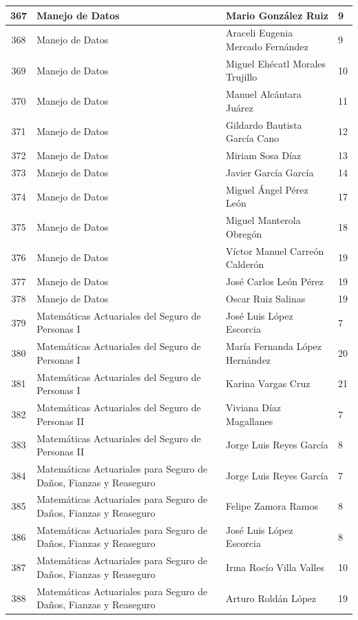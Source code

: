 {\begin{longtable}{|c|p{6.5cm}|p{5cm}|p{1.5cm}|}
  367 & Manejo de Datos & Mario González Ruiz & 9 \\ \hline 
  368 & Manejo de Datos & Araceli Eugenia Mercado Fernández & 9 \\ \hline 
  369 & Manejo de Datos & Miguel Ehécatl Morales Trujillo & 10 \\ \hline 
  370 & Manejo de Datos & Manuel Alcántara Juárez & 11 \\ \hline 
  371 & Manejo de Datos & Gildardo Bautista García Cano & 12 \\ \hline 
  372 & Manejo de Datos & Miriam Sosa Díaz & 13 \\ \hline 
  373 & Manejo de Datos & Javier García García & 14 \\ \hline 
  374 & Manejo de Datos & Miguel Ángel Pérez León & 17 \\ \hline 
  375 & Manejo de Datos & Miguel Manterola Obregón & 18 \\ \hline 
  376 & Manejo de Datos & Víctor Manuel Carreón Calderón & 19 \\ \hline 
  377 & Manejo de Datos & José Carlos León Pérez & 19 \\ \hline 
  378 & Manejo de Datos & Oscar Ruiz Salinas & 19 \\ \hline 
  379 & Matemáticas Actuariales del Seguro de Personas I & José Luis López Escorcia & 7 \\ \hline 
  380 & Matemáticas Actuariales del Seguro de Personas I & María Fernanda López Hernández & 20 \\ \hline 
  381 & Matemáticas Actuariales del Seguro de Personas I & Karina Vargas Cruz & 21 \\ \hline 
  382 & Matemáticas Actuariales del Seguro de Personas II & Viviana Díaz Magallanes & 7 \\ \hline 
  383 & Matemáticas Actuariales del Seguro de Personas II & Jorge Luis Reyes García & 8 \\ \hline 
  384 & Matemáticas Actuariales para Seguro de Daños, Fianzas y Reaseguro & Jorge Luis Reyes García & 7 \\ \hline 
  385 & Matemáticas Actuariales para Seguro de Daños, Fianzas y Reaseguro & Felipe Zamora Ramos & 8 \\ \hline 
  386 & Matemáticas Actuariales para Seguro de Daños, Fianzas y Reaseguro & José Luis López Escorcia & 8 \\ \hline 
  387 & Matemáticas Actuariales para Seguro de Daños, Fianzas y Reaseguro & Irma Rocío Villa Valles & 10 \\ \hline 
  388 & Matemáticas Actuariales para Seguro de Daños, Fianzas y Reaseguro & Arturo Roldán López & 19 \\ \hline 

\end{longtable}}

